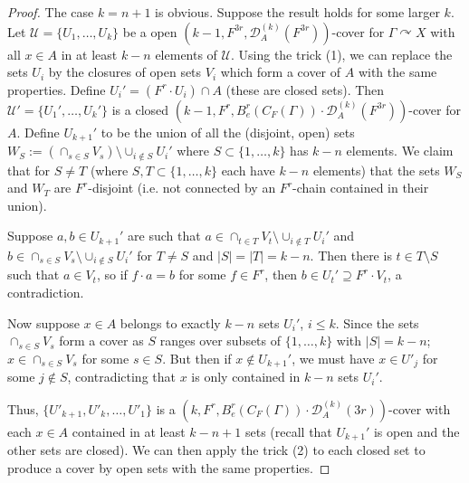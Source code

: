 \documentclass[12pt]{article}
\newcommand{\acts}{\curvearrowright}
\begin{document}
\begin{proof}

The case $k=n+1$ is obvious.  Suppose the result holds for some larger $k$.  Let $\mathcal{U} = \{U_1, \ldots, U_k\}$ be a open $(k-1, F^{3r}, \mathcal{D}_{A}^{(k)}(F^{3r}))$-cover for $\Gamma\acts X$ with all $x\in A$ in at least $k-n$ elements of $\mathcal{U}$.  Using the trick (1), we can replace the sets $U_i$ by the closures of open sets $V_i$ which form a cover of $A$ with the same properties.  Define $U_i' = (F^r\cdot U_i)\cap A$ (these are closed sets).  Then $\mathcal{U}' = \{U_1', \ldots, U_k'\}$ is a closed $(k-1, F^r, B_e^r(C_F(\Gamma))\cdot \mathcal{D}_{A}^{(k)}(F^{3r}))$-cover for $A$.  Define $U_{k+1}'$ to be the union of all the (disjoint, open) sets $W_S := (\cap_{s\in S} V_s)\setminus \cup_{i\notin S} U_i'$ where $S\subset \{1, \ldots, k\}$ has $k-n$ elements.  We claim that for $S\neq T$ (where $S, T\subset \{1, \ldots, k\}$ each have $k-n$ elements) that the sets $W_S$ and $W_T$ are $F^r$-disjoint (i.e. not connected by an $F^r$-chain contained in their union).  

Suppose $a, b\in U_{k+1}'$ are such that $a\in \cap_{t\in T} V_t \setminus \cup_{i\notin T} U_i'$ and $b\in \cap_{s\in S} V_s \setminus \cup_{i\notin S} U_i'$ for $T\neq S$ and $|S| = |T| = k-n$.  Then there is $t\in T\setminus S$ such that $a\in V_t$, so if $f\cdot a = b$ for some $f\in F^r$, then $b\in U_t'\supseteq F^r\cdot V_t$, a contradiction.  

Now suppose $x\in A$ belongs to exactly $k-n$ sets $U_i'$, $i\leq k$.  Since the sets $\cap_{s\in S}V_s$ form a cover as $S$ ranges over subsets of $\{1, \ldots, k\}$ with $|S| = k-n$; $x\in \cap_{s\in S}V_s$ for some $s\in S$.  But then if $x\notin U_{k+1}'$, we must have $x\in U'_j$ for some $j\notin S$, contradicting that $x$ is only contained in $k-n$ sets $U_i'$.  

Thus, $\{U'_{k+1}, U'_k, \ldots, U'_1\}$ is a $(k, F^r, B_e^r(C_F(\Gamma))\cdot \mathcal{D}_{A}^{(k)}(3r))$-cover with each $x\in A$ contained in at least $k-n + 1$ sets (recall that $U_{k+1}'$ is open and the other sets are closed).  We can then apply the trick (2) to each closed set to produce a cover by open sets with the same properties.  \end{proof} 

\end{document}
